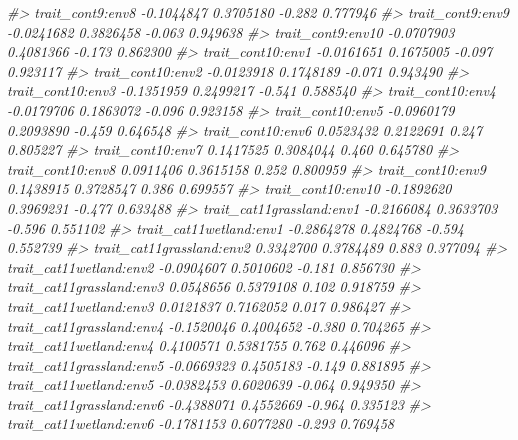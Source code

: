 \documentclass[
]{article}
\newenvironment{Shaded}{\begin{snugshade}}{\end{snugshade}}
\newcommand{\CommentTok}[1]{\textcolor[rgb]{0.56,0.35,0.01}{\textit{#1}}}
\begin{document}
\begin{Shaded}
\begin{Highlighting}[]
\CommentTok{\#\textgreater{} trait\_cont9:env8              {-}0.1044847  0.3705180  {-}0.282 0.777946    }
\CommentTok{\#\textgreater{} trait\_cont9:env9              {-}0.0241682  0.3826458  {-}0.063 0.949638    }
\CommentTok{\#\textgreater{} trait\_cont9:env10             {-}0.0707903  0.4081366  {-}0.173 0.862300    }
\CommentTok{\#\textgreater{} trait\_cont10:env1             {-}0.0161651  0.1675005  {-}0.097 0.923117    }
\CommentTok{\#\textgreater{} trait\_cont10:env2             {-}0.0123918  0.1748189  {-}0.071 0.943490    }
\CommentTok{\#\textgreater{} trait\_cont10:env3             {-}0.1351959  0.2499217  {-}0.541 0.588540    }
\CommentTok{\#\textgreater{} trait\_cont10:env4             {-}0.0179706  0.1863072  {-}0.096 0.923158    }
\CommentTok{\#\textgreater{} trait\_cont10:env5             {-}0.0960179  0.2093890  {-}0.459 0.646548    }
\CommentTok{\#\textgreater{} trait\_cont10:env6              0.0523432  0.2122691   0.247 0.805227    }
\CommentTok{\#\textgreater{} trait\_cont10:env7              0.1417525  0.3084044   0.460 0.645780    }
\CommentTok{\#\textgreater{} trait\_cont10:env8              0.0911406  0.3615158   0.252 0.800959    }
\CommentTok{\#\textgreater{} trait\_cont10:env9              0.1438915  0.3728547   0.386 0.699557    }
\CommentTok{\#\textgreater{} trait\_cont10:env10            {-}0.1892620  0.3969231  {-}0.477 0.633488    }
\CommentTok{\#\textgreater{} trait\_cat11grassland:env1     {-}0.2166084  0.3633703  {-}0.596 0.551102    }
\CommentTok{\#\textgreater{} trait\_cat11wetland:env1       {-}0.2864278  0.4824768  {-}0.594 0.552739    }
\CommentTok{\#\textgreater{} trait\_cat11grassland:env2      0.3342700  0.3784489   0.883 0.377094    }
\CommentTok{\#\textgreater{} trait\_cat11wetland:env2       {-}0.0904607  0.5010602  {-}0.181 0.856730    }
\CommentTok{\#\textgreater{} trait\_cat11grassland:env3      0.0548656  0.5379108   0.102 0.918759    }
\CommentTok{\#\textgreater{} trait\_cat11wetland:env3        0.0121837  0.7162052   0.017 0.986427    }
\CommentTok{\#\textgreater{} trait\_cat11grassland:env4     {-}0.1520046  0.4004652  {-}0.380 0.704265    }
\CommentTok{\#\textgreater{} trait\_cat11wetland:env4        0.4100571  0.5381755   0.762 0.446096    }
\CommentTok{\#\textgreater{} trait\_cat11grassland:env5     {-}0.0669323  0.4505183  {-}0.149 0.881895    }
\CommentTok{\#\textgreater{} trait\_cat11wetland:env5       {-}0.0382453  0.6020639  {-}0.064 0.949350    }
\CommentTok{\#\textgreater{} trait\_cat11grassland:env6     {-}0.4388071  0.4552669  {-}0.964 0.335123    }
\CommentTok{\#\textgreater{} trait\_cat11wetland:env6       {-}0.1781153  0.6077280  {-}0.293 0.769458    }

\end{Highlighting}
\end{Shaded}
\end{document}
